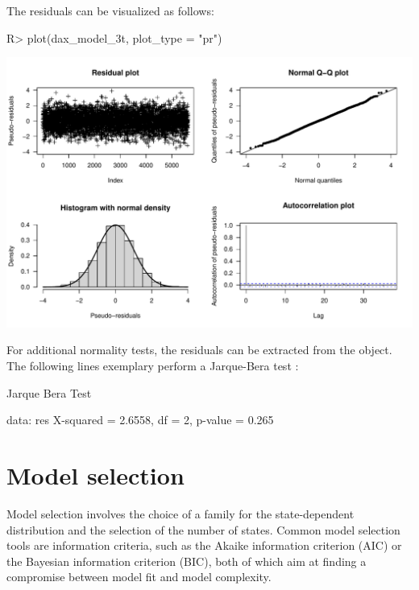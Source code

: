 \documentclass[article]{jss}
\begin{document}
The residuals can be visualized as follows:

%
\begin{Schunk}
\begin{Sinput}
R> plot(dax_model_3t, plot_type = "pr")
\end{Sinput}
\end{Schunk}
\includegraphics{fhmm_oelschlaeger_adam_michels-residuals}
%

For additional normality tests, the residuals can be extracted from the  object. The following lines exemplary perform a Jarque-Bera test \cite{jar87}:

%
\begin{Schunk}
\begin{Soutput}
	Jarque Bera Test

data:  res
X-squared = 2.6558, df = 2, p-value = 0.265
\end{Soutput}
\end{Schunk}
%

\section{Model selection} \label{sec:model_selection} %

Model selection involves the choice of a family for the state-dependent distribution and the selection of the number of states. Common model selection tools are information criteria, such as the Akaike information criterion (AIC) or the Bayesian information criterion (BIC), both of which aim at finding a compromise between model fit and model complexity.
\end{document}
